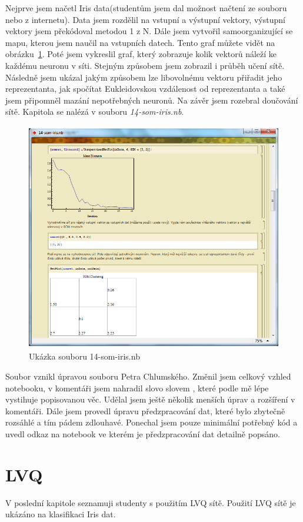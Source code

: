 \documentclass[11pt,twoside,a4paper]{book}
\begin{document}
Nejprve jsem načetl Iris data(studentům jsem dal možnost načtení ze souboru nebo z internetu). Data jsem rozdělil na vstupní a výstupní vektory, výstupní vektory jsem překódoval metodou 1 z N. Dále jsem vytvořil samoorganizující se mapu, kterou jsem naučil na vstupních datech. Tento graf můžete vidět na obrázku~\ref{fig:som-iris}. Poté jsem vykreslil graf, který zobrazuje kolik vektorů náleží ke každému neuronu v síti. Stejným způsobem jsem zobrazil i průběh učení sítě. Následně jsem ukázal jakým způsobem lze libovolnému vektoru přiřadit jeho reprezentanta, jak spočítat Eukleidovskou vzdálenost od reprezentanta a také jsem připomněl mazání nepotřebných neuronů. Na závěr jsem rozebral doučování sítě. Kapitola se nalézá v souboru \textit{14-som-iris.nb}.

\begin{figure}[h!]
\begin{center}
\includegraphics[height=10cm]{figures/ukazka14.png}
\caption{Ukázka souboru 14-som-iris.nb}
\label{fig:som-iris}
\end{center}
\end{figure}

Soubor vznikl úpravou souboru Petra Chlumského. Změnil jsem celkový vzhled notebooku, v komentáři jsem nahradil slovo  slovem , které podle mě lépe vystihuje popisovanou věc. Udělal jsem ještě několik menších úprav a rozšíření v komentáři. Dále jsem provedl úpravu předzpracování dat, které bylo zbytečně rozsáhlé a tím pádem zdlouhavé. Ponechal jsem pouze minimální potřebný kód a uvedl odkaz na notebook ve kterém je předzpracování dat detailně popsáno.
\section{LVQ}
V poslední kapitole seznamuji studenty s použitím LVQ sítě. Použití LVQ sítě je ukázáno na klasifikaci Iris dat.
\end{document}
